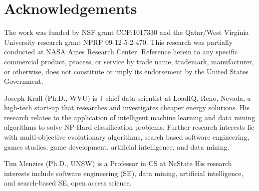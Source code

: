 \documentclass[journal]{IEEEtran}
\begin{document}
\section*{Acknowledgements}

The work was funded by NSF grant CCF:1017330 and the
Qatar/West Virginia University research grant NPRP
09-12-5-2-470.  This research was partially
conducted at NASA Ames Research Center. Reference
herein to any specific commercial product, process,
or service by trade name, trademark, manufacturer,
or otherwise, does not constitute or imply its
endorsement by the United States Government.




\newpage
\begin{IEEEbiography}{Joseph Krall}
(Ph.D., WVU)
is J chief data scientist at LoadIQ, Reno, Nevada, a high-tech start-up that researches and investigates cheaper energy solutions.
His research relates to the application of
intelligent machine learning and data mining algorithms to solve NP-Hard classification problems.
Further research interests lie with multi-objective evolutionary algorithms, 
search based software engineering, games studies, game development, artificial intelligence, and data mining.
\end{IEEEbiography}

\begin{IEEEbiography}{Tim Menzies} (Ph.D., UNSW)
is a Professor in CS at NcState  His research interests include software engineering (SE), data mining, artificial intelligence, and search-based SE, open access science. 
\end{IEEEbiography}
\end{document}
